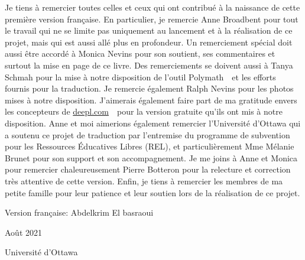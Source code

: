 Je tiens \`a remercier toutes celles et ceux qui ont contribu\'e \`a la naissance de cette premi\`ere version fran\c{c}aise. En particulier, je remercie Anne Broadbent pour tout le travail qui ne se limite pas uniquement au lancement et \`a la r\'ealisation de ce projet, mais qui est aussi allé plus en profondeur.
Un remerciement spécial doit aussi être accordé \`a Monica Nevins pour son soutient, ses commentaires et surtout la mise en page de ce livre. Des remerciements se doivent aussi \`a Tanya Schmah pour la mise \`a notre disposition de l'outil \og Polymath~\fg\ et les efforts fournis pour la traduction. Je remercie également Ralph Nevins pour les photos mises \`a notre disposition.
J'aimerais \'egalement faire part de ma gratitude envers les concepteurs de \og \url{deepl.com}~\fg\ pour la version gratuite qu'ils ont mis à notre disposition.
Anne et moi aimerions également remercier l’Université d’Ottawa qui a soutenu ce projet de traduction par l’entremise du programme de subvention pour les Ressources Éducatives Libres (REL), et particuli\`erement Mme Mélanie Brunet pour son support et son accompagnement. 
Je me joins \`a Anne et Monica pour remercier chaleureusement Pierre Botteron pour la relecture et correction tr\`es attentive de cette version. 
Enfin, je tiens \`a remercier les membres de ma petite famille pour leur patience et leur soutien lors de la r\'ealisation de ce projet.

\vspace{10mm}

{\flushright

Version fran\c{c}aise: Abdelkrim El basraoui




Ao\^ut 2021



Universit\'e d'Ottawa

} 